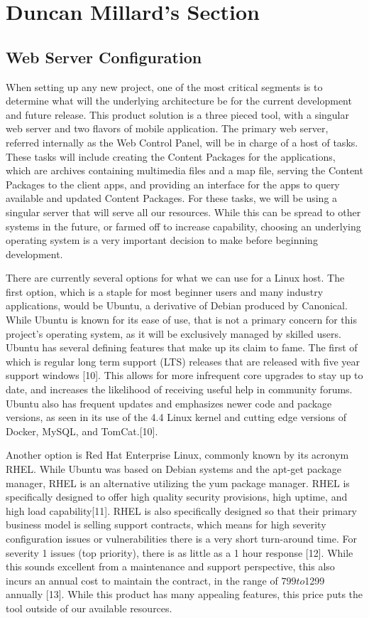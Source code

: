 \documentclass[letterpaper, 10pt,titlepage]{article}
\begin{document}
\vspace{0.5cm}

\section{Duncan Millard's Section}
\subsection{Web Server Configuration}
When setting up any new project, one of the most critical segments is to determine what will the underlying architecture be for the current development and future release. This product solution is a three pieced tool, with a singular web server and two flavors of mobile application. The primary web server, referred internally as the Web Control Panel, will be in charge of a host of tasks. These tasks will include creating the Content Packages for the applications, which are archives containing multimedia files and a map file, serving the Content Packages to the client apps, and providing an interface for the apps to query available and updated Content Packages. For these tasks, we will be using a singular server that will serve all our resources. While this can be spread to other systems in the future, or farmed off to increase capability, choosing an underlying operating system is a very important decision to make before beginning development.


There are currently several options for what we can use for a Linux host. The first option, which is a staple for most beginner users and many industry applications, would be Ubuntu, a derivative of Debian produced by Canonical. While Ubuntu is known for its ease of use, that is not a primary concern for this project’s operating system, as it will be exclusively managed by skilled users. Ubuntu has several defining features that make up its claim to fame. The first of which is regular long term support (LTS) releases that are released with five year support windows [10]. This allows for more infrequent core upgrades to stay up to date, and increases the likelihood of receiving useful help in community forums. Ubuntu also has frequent updates and emphasizes newer code and package versions, as seen in its use of the 4.4 Linux kernel and  cutting edge versions of Docker, MySQL, and TomCat.[10]. 


Another option is Red Hat Enterprise Linux, commonly known by its acronym RHEL. While Ubuntu was based on Debian systems and the apt-get package manager, RHEL is an alternative utilizing the yum package manager. RHEL is specifically designed to offer high quality security provisions, high uptime, and high load capability[11]. RHEL is also specifically designed so that their primary business model is selling support contracts, which means for high severity configuration issues or vulnerabilities there is a very short turn-around time. For severity 1 issues (top priority), there is as little as a 1 hour response [12]. While this sounds excellent from a maintenance and support perspective, this also incurs an annual cost to maintain the contract, in the range of $799 to $1299 annually [13]. While this product has many appealing features, this price puts the tool outside of our available resources.
\end{document}
